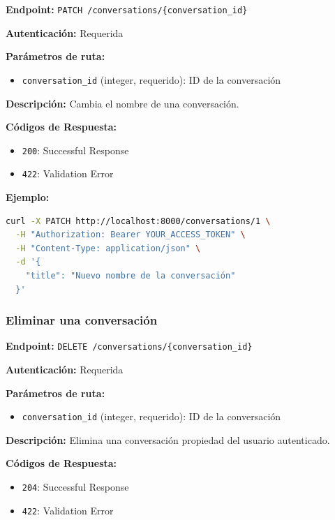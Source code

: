 \textbf{Endpoint:} \texttt{PATCH /conversations/\{conversation\_id\}}

\textbf{Autenticación:} Requerida

\textbf{Parámetros de ruta:}
\begin{itemize}
    \item \texttt{conversation\_id} (integer, requerido): ID de la conversación
\end{itemize}

\textbf{Descripción:} Cambia el nombre de una conversación.

\textbf{Códigos de Respuesta:}
\begin{itemize}
    \item \texttt{200}: Successful Response
    \item \texttt{422}: Validation Error
\end{itemize}

\textbf{Ejemplo:}

\begin{lstlisting}[language=bash]
curl -X PATCH http://localhost:8000/conversations/1 \
  -H "Authorization: Bearer YOUR_ACCESS_TOKEN" \
  -H "Content-Type: application/json" \
  -d '{
    "title": "Nuevo nombre de la conversación"
  }'
\end{lstlisting}

\subsubsection{Eliminar una conversación}
\label{subsubsection:A-3-Eliminar una conversación}

\textbf{Endpoint:} \texttt{DELETE /conversations/\{conversation\_id\}}

\textbf{Autenticación:} Requerida

\textbf{Parámetros de ruta:}
\begin{itemize}
    \item \texttt{conversation\_id} (integer, requerido): ID de la conversación
\end{itemize}

\textbf{Descripción:} Elimina una conversación propiedad del usuario autenticado.

\textbf{Códigos de Respuesta:}
\begin{itemize}
    \item \texttt{204}: Successful Response
    \item \texttt{422}: Validation Error
\end{itemize}

